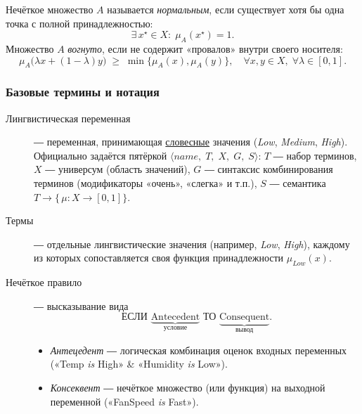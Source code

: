 \begin{definition}
Нечёткое множество $A$ называется
\emph{нормальным}, если существует хотя бы одна точка
с полной принадлежностью:
\begin{equation}
  \exists\,x^\star\in X:\; \mu_A(x^\star)=1.
\end{equation}
Множество $A$ \emph{вогнуто}, если не содержит «провалов» внутри
своего носителя:
\begin{equation}
  \mu_A\!\bigl(\lambda x+(1-\lambda)y\bigr)\;\ge\;
  \min\{\mu_A(x),\mu_A(y)\},
  \quad \forall x,y\in X,\;\forall\lambda\in[0,1].
\end{equation}
\end{definition}

\subsubsection{Базовые термины и нотация}

\begin{description}
  \item[Лингвистическая переменная] ― переменная, принимающая
        \underline{словесные} значения
        (\textit{Low}, \textit{Medium}, \textit{High}).
        Официально задаётся пятёркой
        $\langle\!name,\;T,\;X,\;G,\;S\rangle$:
        \(
          T
        \) ― набор терминов,
        \(
          X
        \) ― универсум (область значений),
        \(
          G
        \) ― синтаксис комбинирования терминов
        (модификаторы «очень», «слегка» и т.п.),
        \(
          S
        \) ― семантика
        \(T \!\longrightarrow\! \bigl\{\,\mu\colon X\!\to\![0,1]\bigr\}\).
        \smallskip

  \item[Термы] ― отдельные лингвистические значения
        (например, \textit{Low}, \textit{High}),
        каждому из которых сопоставляется
        своя функция принадлежности $\mu_{\textit{Low}}(x)$.

  \item[Нечёткое правило] ― высказывание вида
        \[
          \textbf{ЕСЛИ }\underbrace{\text{Antecedent}}_{\text{условие}}
          \textbf{ ТО }\underbrace{\text{Consequent}}_{\text{вывод}}.
        \]
        \begin{itemize}
          \item \emph{Антецедент} ― логическая комбинация оценок
                входных переменных («Temp \textit{is} High» \& «Humidity
                \textit{is} Low»).
          \item \emph{Консеквент} ― нечёткое множество
                (или функция) на выходной переменной
                («FanSpeed \textit{is} Fast»).
        \end{itemize}
\end{description}

